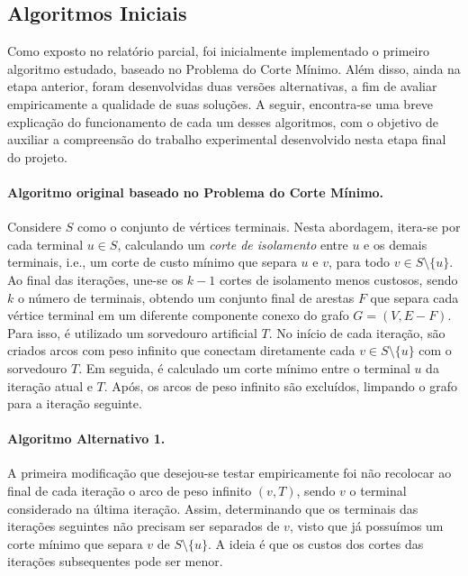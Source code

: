 \documentclass[12pt, a4paper]{article}
\begin{document}
\subsection{Algoritmos Iniciais}\label{subsection:algoritmos_iniciais}
Como exposto no relatório parcial, foi inicialmente implementado o primeiro algoritmo estudado, baseado no Problema do Corte Mínimo. Além disso, ainda na etapa anterior, foram desenvolvidas duas versões alternativas, a fim de avaliar empiricamente a qualidade de suas soluções. A seguir, encontra-se uma breve explicação do funcionamento de cada um desses algoritmos, com o objetivo de auxiliar a compreensão do trabalho experimental desenvolvido nesta etapa final do projeto.

\paragraph{Algoritmo original baseado no Problema do Corte Mínimo.} Considere $S$ como o conjunto de vértices terminais. Nesta abordagem, itera-se por cada terminal $u \in S$, calculando um \emph{corte de isolamento} entre $u$ e os demais terminais, i.e., um corte de custo mínimo que separa $u$ e $v$, para todo $v \in S \setminus \{u\}$. Ao final das iterações, une-se os $k-1$ cortes de isolamento menos custosos, sendo $k$ o número de terminais, obtendo um conjunto final de arestas $F$ que separa cada vértice terminal em um diferente componente conexo do grafo $G=(V, E-F)$. Para isso, é utilizado um sorvedouro artificial $T$. No início de cada iteração, são criados arcos com peso infinito que conectam diretamente cada $v \in S \setminus \{u\}$ com o sorvedouro $T$. Em seguida, é calculado um corte mínimo entre o terminal $u$ da iteração atual e $T$. Após, os arcos de peso infinito são excluídos, limpando o grafo para a iteração seguinte.

\paragraph{Algoritmo Alternativo 1.} A primeira modificação que desejou-se testar empiricamente foi não recolocar ao final de cada iteração o arco de peso infinito $(v, T)$, sendo $v$ o terminal considerado na última iteração. Assim, determinando que os terminais das iterações seguintes não precisam ser separados de $v$, visto que já possuímos um corte mínimo que separa $v$ de $S \setminus \{u\}$. A ideia é que os custos dos cortes das iterações subsequentes pode ser menor.
\end{document}

